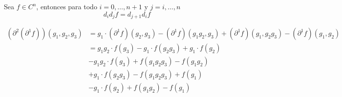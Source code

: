 \begin{lema}\label{lem:coborde}
	Sea $f\in C^n$, entonces para todo $i=0,\ldots,n+1$ y $j=i,\ldots,n$
	\begin{equation}
		d_id_jf=d_{j+1}d_if
	\end{equation}
	\begin{demostracion}
%		
%		
		
		\begin{align*}
			(\partial^2(\partial^1f))(g_1,g_2,g_3) 
			& = g_1\cdot (\partial^1f)(g_2,g_3) - (\partial^1f)(g_1g_2,g_3) + (\partial^1f)(g_1,g_2g_3) - (\partial^1f)(g_1,g_2) \\
			& = g_1g_2\cdot f(g_3) - g_1\cdot f(g_2g_3) + g_1\cdot f(g_2) \\
			& - g_1g_2\cdot f(g_3) + f(g_1g_2g_3) - f(g_1g_2) \\
			& + g_1\cdot f(g_2g_3) - f(g_1g_2g_3) + f(g_1) \\
			& - g_1\cdot f(g_2) + f(g_1g_2) - f(g_1)
		\end{align*}
	\end{demostracion}
\end{lema}


